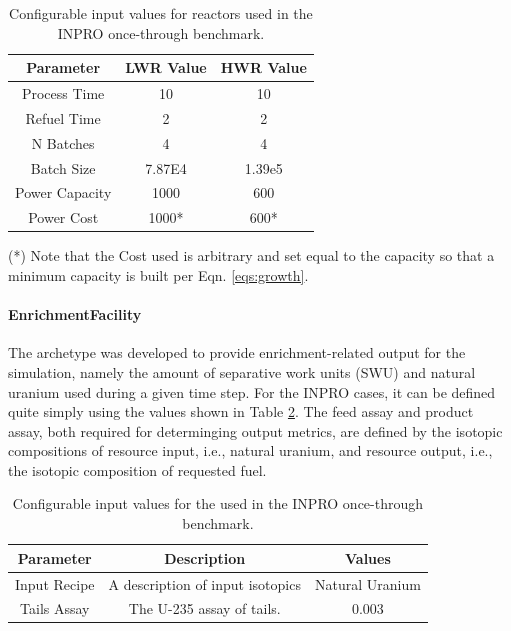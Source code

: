 \begin{table}[h]
\centering
\begin{threeparttable}
\begin{tabular}{ccc}
Parameter      & LWR Value & HWR Value               \\ \hline
Process Time   & 10         & 10                       \\
Refuel Time    & 2          & 2                        \\
N Batches      & 4          & 4                        \\
Batch Size     & 7.87E4     & 1.39e5                   \\
Power Capacity & 1000       & 600                      \\
Power Cost     & 1000*      & 600* \\ \hline
\end{tabular}
\begin{tablenotes}
  \small
  \item (*) Note that the Cost used is arbitrary and set equal to the
  capacity so that a minimum capacity is built per Eqn. \ref{eqs:growth}.
\end{tablenotes}
\end{threeparttable}
\label{tbl:inprorxtr}
\caption{Configurable input values for reactors used in the INPRO once-through benchmark.}
\end{table}

\paragraph{EnrichmentFacility}

The  archetype was developed to provide
enrichment-related output for the simulation, namely the amount of separative
work units (SWU) and natural uranium used during a given time step. For the
INPRO cases, it can be defined quite simply using the values shown in Table
\ref{tbl:inproenr}. The feed assay and product assay, both required for
determinging output metrics, are defined by the isotopic compositions of
resource input, i.e., natural uranium, and resource output, i.e., the isotopic
composition of requested fuel.

\begin{table}[h]
\centering
\begin{tabular}{ccc}
Parameter    & Description                      & Values          \\ \hline
Input Recipe & A description of input isotopics & Natural Uranium \\
Tails Assay  & The U-235 assay of tails.        & 0.003          
\end{tabular}
\caption{Configurable input values for the  used in the
  INPRO once-through benchmark.}
\label{tbl:inproenr}
\end{table}


